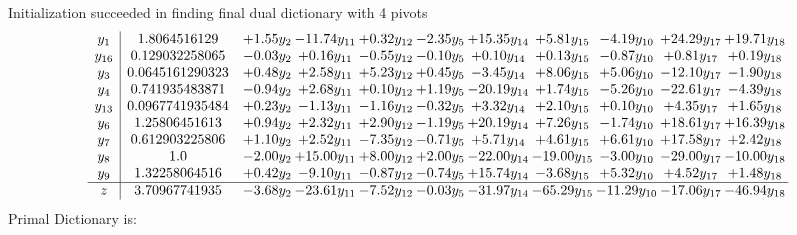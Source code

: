 \documentclass[9pt]{article}
\begin{document}
Initialization succeeded in finding final dual dictionary with 4 pivots
\[\begin{array}{c| c c@{\hskip 2pt} c@{\hskip 2pt} c@{\hskip 2pt} c@{\hskip 2pt} c@{\hskip 2pt} c@{\hskip 2pt} c@{\hskip 2pt} c@{\hskip 2pt} c@{\hskip 2pt} }
 y_{1}   &  1.8064516129 & +  1.55 y_{2} & -11.74 y_{11} & +  0.32 y_{12} & -2.35 y_{5} & + 15.35 y_{14} & +  5.81 y_{15} & -4.19 y_{10} & + 24.29 y_{17} & + 19.71 y_{18}\\
 y_{16}   &  0.129032258065 & -0.03 y_{2} & +  0.16 y_{11} & -0.55 y_{12} & -0.10 y_{5} & +  0.10 y_{14} & +  0.13 y_{15} & -0.87 y_{10} & +  0.81 y_{17} & +  0.19 y_{18}\\
 y_{3}   &  0.0645161290323 & +  0.48 y_{2} & +  2.58 y_{11} & +  5.23 y_{12} & +  0.45 y_{5} & -3.45 y_{14} & +  8.06 y_{15} & +  5.06 y_{10} & -12.10 y_{17} & -1.90 y_{18}\\
 y_{4}   &  0.741935483871 & -0.94 y_{2} & +  2.68 y_{11} & +  0.10 y_{12} & +  1.19 y_{5} & -20.19 y_{14} & +  1.74 y_{15} & -5.26 y_{10} & -22.61 y_{17} & -4.39 y_{18}\\
 y_{13}   &  0.0967741935484 & +  0.23 y_{2} & -1.13 y_{11} & -1.16 y_{12} & -0.32 y_{5} & +  3.32 y_{14} & +  2.10 y_{15} & +  0.10 y_{10} & +  4.35 y_{17} & +  1.65 y_{18}\\
 y_{6}   &  1.25806451613 & +  0.94 y_{2} & +  2.32 y_{11} & +  2.90 y_{12} & -1.19 y_{5} & + 20.19 y_{14} & +  7.26 y_{15} & -1.74 y_{10} & + 18.61 y_{17} & + 16.39 y_{18}\\
 y_{7}   &  0.612903225806 & +  1.10 y_{2} & +  2.52 y_{11} & -7.35 y_{12} & -0.71 y_{5} & +  5.71 y_{14} & +  4.61 y_{15} & +  6.61 y_{10} & + 17.58 y_{17} & +  2.42 y_{18}\\
 y_{8}   &  1.0 & -2.00 y_{2} & + 15.00 y_{11} & +  8.00 y_{12} & +  2.00 y_{5} & -22.00 y_{14} & -19.00 y_{15} & -3.00 y_{10} & -29.00 y_{17} & -10.00 y_{18}\\
 y_{9}   &  1.32258064516 & +  0.42 y_{2} & -9.10 y_{11} & -0.87 y_{12} & -0.74 y_{5} & + 15.74 y_{14} & -3.68 y_{15} & +  5.32 y_{10} & +  4.52 y_{17} & +  1.48 y_{18}\\
\hline
z    &  3.70967741935 & -3.68 y_{2} & -23.61 y_{11} & -7.52 y_{12} & -0.03 y_{5} & -31.97 y_{14} & -65.29 y_{15} & -11.29 y_{10} & -17.06 y_{17} & -46.94 y_{18}\\
\end{array}\]
Primal Dictionary is:
\end{document}
